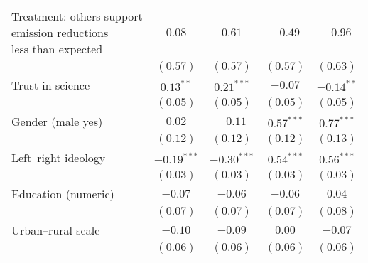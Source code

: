 \begin{table}[h]
\begin{center}
\begin{tabular}{l c c c c}
\shortstack{Treatment: others support\\emission reductions\\less than expected}                           & $0.08$        & $0.61$        & $-0.49$       & $-0.96$       \\
                                                                                                          & $(0.57)$      & $(0.57)$      & $(0.57)$      & $(0.63)$      \\
Trust in science                                                                                          & $0.13^{**}$   & $0.21^{***}$  & $-0.07$       & $-0.14^{**}$  \\
                                                                                                          & $(0.05)$      & $(0.05)$      & $(0.05)$      & $(0.05)$      \\
Gender (male yes)                                                                                         & $0.02$        & $-0.11$       & $0.57^{***}$  & $0.77^{***}$  \\
                                                                                                          & $(0.12)$      & $(0.12)$      & $(0.12)$      & $(0.13)$      \\
Left–right ideology                                                                                       & $-0.19^{***}$ & $-0.30^{***}$ & $0.54^{***}$  & $0.56^{***}$  \\
                                                                                                          & $(0.03)$      & $(0.03)$      & $(0.03)$      & $(0.03)$      \\
Education (numeric)                                                                                       & $-0.07$       & $-0.06$       & $-0.06$       & $0.04$        \\
                                                                                                          & $(0.07)$      & $(0.07)$      & $(0.07)$      & $(0.08)$      \\
Urban–rural scale                                                                                         & $-0.10$       & $-0.09$       & $0.00$        & $-0.07$       \\
                                                                                                          & $(0.06)$      & $(0.06)$      & $(0.06)$      & $(0.06)$      \\

\end{tabular}
\end{center}
\end{table}
